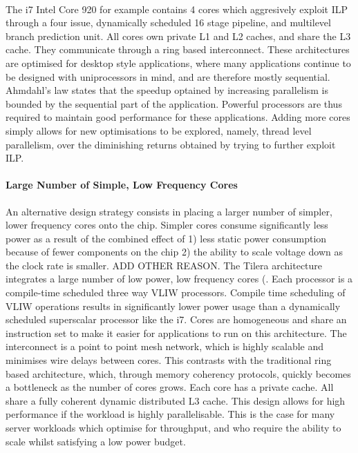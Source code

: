 \paragraph{} The i7 Intel Core 920 for example contains 4 cores which aggresively
exploit ILP through a four issue,  dynamically scheduled 16 stage pipeline,
and multilevel branch prediction unit. All cores own
 private L1 and L2 caches, and share the L3 cache. They communicate
through a ring based interconnect. These architectures are
optimised for desktop style applications, where many applications continue
to be designed with uniprocessors in mind, and are therefore mostly sequential.
Ahmdahl's law states that the speedup optained by increasing parallelism 
is bounded by the sequential part of the application. Powerful processors are 
thus required to maintain good performance for these applications. 
Adding more cores simply allows for new optimisations to be explored, namely, 
thread level parallelism, over the diminishing returns obtained by trying
to further exploit ILP. 


\paragraph{Large Number of Simple, Low Frequency Cores} An alternative
design strategy consists in placing a larger number of simpler, lower frequency cores
onto the chip. Simpler cores consume significantly less power as
a result of the combined effect of 1) less static power consumption because 
of fewer components on the chip 2) the ability to scale voltage down as
the clock rate is smaller. ADD OTHER REASON. The Tilera
architecture integrates a large number of low power, low frequency 
cores (. Each processor is a compile-time scheduled three way VLIW processors.
Compile time scheduling of VLIW operations results in significantly
lower power usage than a dynamically scheduled superscalar
processor like the i7. Cores are homogeneous and share 
an instruction set to make it easier for applications to run on
this architecture.  The interconnect is a point to point mesh network, which
is highly scalable and minimises wire delays between cores. This
contrasts with the traditional ring based architecture, which,
through memory coherency protocols, quickly becomes a bottleneck
as the number of cores grows. Each
core has a private cache. All share a fully coherent dynamic
distributed L3 cache.  This design allows for high performance
if the workload is highly parallelisable. This is the case for many 
server workloads which optimise for throughput, and who require
the ability to scale whilst satisfying a low power budget.  


